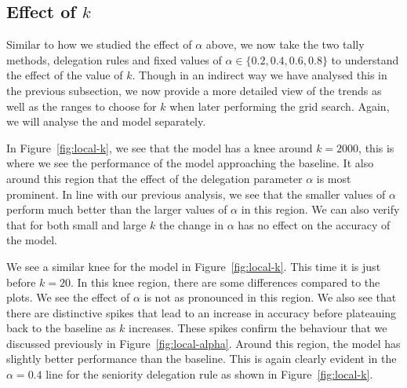 \subsection{Effect of $k$}
Similar to how we studied the effect of $\alpha$ above, we now take the two tally methods, delegation rules and fixed values of $\alpha \in \{0.2,0.4,0.6,0.8\}$ to understand the effect of the value of $k$. Though in an indirect way we have analysed this in the previous subsection, we now provide a more detailed view of the trends as well as the ranges to choose for $k$ when later performing the grid search. Again, we will analyse the \globalv and \localv model separately.

In Figure~\ref{fig:local-k}, we see that the \globalv model has a knee around $k=2000$, this is where we see the performance of the model approaching the baseline. It also around this region that the effect of the delegation parameter $\alpha$ is most prominent. In line with our previous analysis, we see that the smaller values of $\alpha$ perform much better than the larger values of $\alpha$ in this region. We can also verify that for both small and large $k$ the change in $\alpha$ has no effect on the accuracy of the model.

We see a similar knee for the \localv model in Figure~\ref{fig:local-k}. This time it is just before $k=20$. In this knee region, there are some differences compared to the \globalv plots. We see the effect of $\alpha$ is not as pronounced in this region. We also see that there are distinctive spikes that lead to an increase in accuracy before plateauing back to the baseline as $k$ increases. These spikes confirm the behaviour that we discussed previously in Figure~\ref{fig:local-alpha}. Around this region, the \localv model has slightly better performance than the baseline. This is again clearly evident in the $\alpha=0.4$ line for the seniority delegation rule as shown in Figure~\ref{fig:local-k}.

